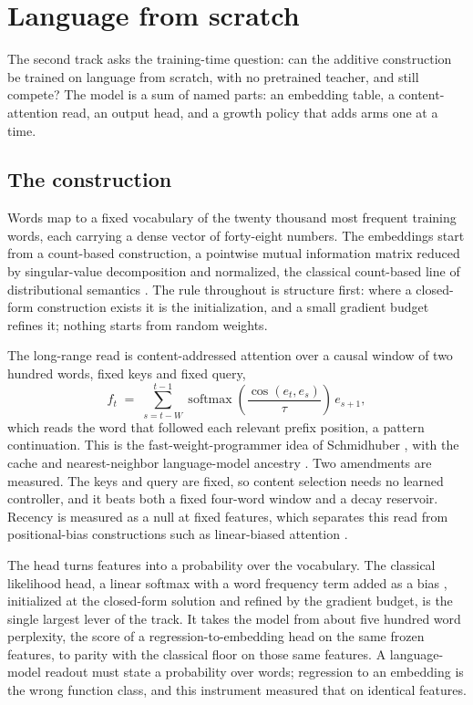 \documentclass[11pt]{article}
\DeclareMathOperator{\softmax}{softmax}
\begin{document}
\section{Language from scratch}

The second track asks the training-time question: can the additive
construction be trained on language from scratch, with no
pretrained teacher, and still compete? The model is a sum of named
parts: an embedding table, a content-attention read, an output
head, and a growth policy that adds arms one at a time.

\subsection{The construction}

Words map to a fixed vocabulary of the twenty thousand most
frequent training words, each carrying a dense vector of
forty-eight numbers. The embeddings start from a count-based
construction, a pointwise mutual information matrix reduced by
singular-value decomposition and normalized, the classical
count-based line of distributional semantics \cite{levy2014}. The
rule throughout is structure first: where a closed-form
construction exists it is the initialization, and a small gradient
budget refines it; nothing starts from random weights.

The long-range read is content-addressed attention over a causal
window of two hundred words, fixed keys and fixed query,
\begin{equation}
    f_t \;=\; \sum_{s=t-W}^{t-1}
        \softmax\!\left(\frac{\cos(e_t, e_s)}{\tau}\right)\, e_{s+1},
\end{equation}
which reads the word that followed each relevant prefix position, a
pattern continuation. This is the fast-weight-programmer idea of
Schmidhuber \cite{schmidhuber1992}, with the cache and
nearest-neighbor language-model ancestry \cite{grave2017,
khandelwal2019}. Two amendments are measured. The keys and query
are fixed, so content selection needs no learned controller, and it
beats both a fixed four-word window and a decay reservoir. Recency
is measured as a null at fixed features, which separates this read
from positional-bias constructions such as linear-biased attention
\cite{press2021}.

The head turns features into a probability over the vocabulary.
The classical likelihood head, a linear softmax with a word
frequency term added as a bias \cite{bengio2003, mikolov2010},
initialized at the closed-form solution and refined by the gradient
budget, is the single largest lever of the track. It takes the
model from about five hundred word perplexity, the score of a
regression-to-embedding head on the same frozen features, to parity
with the classical floor on those same features. A language-model
readout must state a probability over words; regression to an
embedding is the wrong function class, and this instrument measured
that on identical features.
\end{document}
